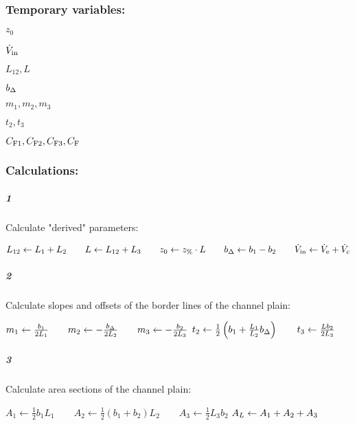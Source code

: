 \subsubsection*{Temporary variables:}
\begin{multicols}{3}
  \begin{packed_item}
    \item $z_0$
    \item $\dot{V}_\text{in}$
    \item $L_{12}, L$  
    \item $b_\Delta$
    \item $m_1, m_2, m_3$
    \item $t_2, t_3$
    \item $C_\text{F1}, C_\text{F2}, C_\text{F3}, C_\text{F}$
  \end{packed_item}
\end{multicols}
\subsubsection*{Calculations:}
\subparagraph{1}
Calculate "derived" parameters:
\begin{algorithmic}
  \State $L_{12} \leftarrow L_1 + L_2
  \qquad L \leftarrow L_{12} + L_3
  \qquad z_0 \leftarrow z_\text{\%} \cdot L
  \qquad b_\Delta \leftarrow  b_1 - b_2
  \qquad \dot{V}_\text{in} \leftarrow \dot{V}_\text{e} + \dot{V}_\text{c}
  $
\end{algorithmic}
\subparagraph{2}
Calculate slopes and offsets of the border lines of the channel plain:
\begin{algorithmic}
  \State $       m_1 \leftarrow   \frac{b_1}{2L_1}
  \qquad m_2 \leftarrow - \frac{b_\Delta}{2L_2}
  \qquad m_3 \leftarrow - \frac{b_2}{2L_3}
  $\vspace*{.5ex}
  \State $           t_2 \leftarrow \frac{1}{2} \left( b_1 +  \frac{L_1}{L_2}b_\Delta \right)
  \qquad t_3 \leftarrow \frac{L b_2}{2 L_3 }
  $\vspace*{.5ex}
\end{algorithmic}
\subparagraph{3}
Calculate area sections of the channel plain:
\begin{algorithmic}
  \State $       A_1 \leftarrow \frac{1}{2} b_1  L_1  
  \qquad A_2 \leftarrow  \frac{1}{2} (b_1 + b_2) L_2  
  \qquad A_3 \leftarrow \frac{1}{2} L_3b_2  
  $\vspace*{.5ex}
  \State $  A_L \leftarrow A_1 + A_2 + A_3
  $\vspace*{.5ex}
\end{algorithmic}

